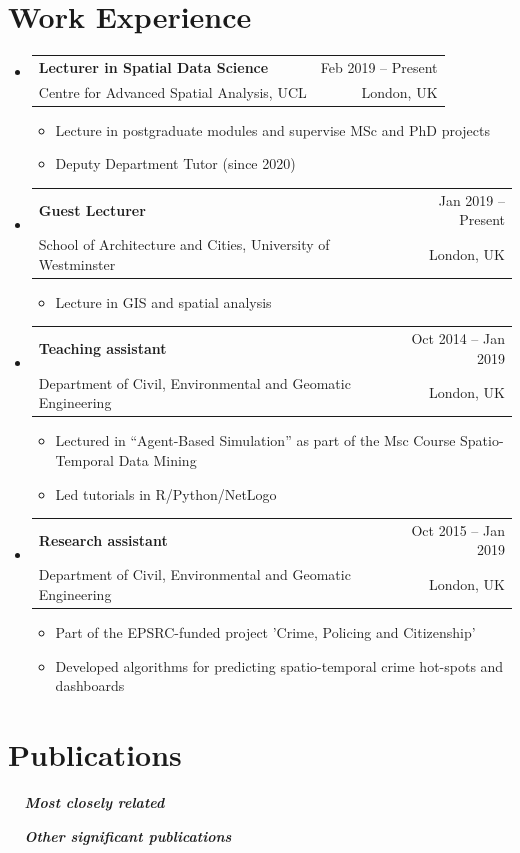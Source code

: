 \documentclass[A4,11pt]{article}
\makeatletter
\newcommand*{\newbibstartnumber}[1]{%
  \apptocmd{\thebibliography}{%
    \global\c@NAT@ctr #1\relax
    \addtocounter{NAT@ctr}{-1}%
  }{}{}%
}
\newcommand{\CVItem}[1]{
  \item\small{
    {#1 \vspace{-2pt}}
  }
}
\newcommand{\CVSubheading}[4]{
  \vspace{-2pt}\item
    \begin{tabular*}{0.97\textwidth}[t]{l@{\extracolsep{\fill}}r}
      \textbf{#1} & #2 \\
      \small#3 & \small #4 \\
    \end{tabular*}\vspace{-7pt}
}
\newcommand{\CVSubHeadingListStart}{\begin{itemize}[leftmargin=0.5cm, label={}]}
\newcommand{\CVSubHeadingListEnd}{\end{itemize}}
\newcommand{\CVItemListStart}{\begin{itemize}}
\newcommand{\CVItemListEnd}{\end{itemize}\vspace{-5pt}}
\makeatother
\begin{document}
\section{Work Experience}
  \CVSubHeadingListStart
    \CVSubheading
      {Lecturer in Spatial Data Science}{Feb 2019 -- Present}
      {Centre for Advanced Spatial Analysis, UCL}{London, UK}
      \CVItemListStart
        \CVItem{Lecture in postgraduate modules and supervise MSc and PhD projects}        
        \CVItem{Deputy Department Tutor (since 2020)}
      \CVItemListEnd
    \CVSubheading
      {Guest Lecturer}{Jan 2019 -- Present}
      {School of Architecture and Cities, University of Westminster}{London, UK}
      \CVItemListStart
        \CVItem{Lecture in GIS and spatial analysis}
    \CVItemListEnd
    \CVSubheading
      {Teaching assistant}{Oct 2014 -- Jan 2019}
      {Department of Civil, Environmental and Geomatic Engineering}{London, UK}
      \CVItemListStart
        \CVItem{Lectured in “Agent-Based Simulation” as part of the Msc Course Spatio-Temporal Data Mining}
        \CVItem{Led tutorials in R/Python/NetLogo}
      \CVItemListEnd
     \CVSubheading
      {Research assistant}{Oct 2015 -- Jan 2019}
      {Department of Civil, Environmental and Geomatic Engineering}{London, UK}
      \CVItemListStart
        \CVItem{Part of the EPSRC-funded project 'Crime, Policing and Citizenship'}
        \CVItem{Developed algorithms for predicting spatio-temporal crime hot-spots and dashboards}
      \CVItemListEnd
  \CVSubHeadingListEnd

\section{Publications}

\vspace{2mm}
\noindent \textbf{\textit{\ \ Most closely related}}
\begin{bibunit}
\nocite{PirieNatPhys2020,MattPRB2020,WebbPRX2019,GozarNanoLett2017,HuangPRL2015}
\putbib[publications]
\end{bibunit}

\vspace{2mm}
\noindent \textbf{\textit{\ \ Other significant publications}}
\newbibstartnumber{6}
\begin{bibunit}
\nocite{apsrev42Control}
\nocite{CominScience2014,ZeljkovicNanoLetters2014,SoumyanarayananPNAS2013,ZeljkovicScience2012,HoffmanScience2002qpi}
\putbib[publications]
\end{bibunit}
\end{document}
